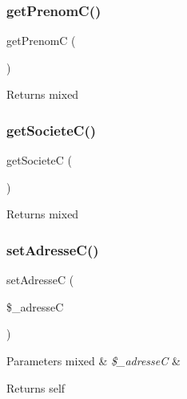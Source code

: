 \subsubsection{\texorpdfstring{get\+Prenom\+C()}{getPrenomC()}}
{\footnotesize\ttfamily get\+PrenomC (\begin{DoxyParamCaption}{ }\end{DoxyParamCaption})}

\begin{DoxyReturn}{Returns}
mixed 
\end{DoxyReturn}
\mbox{\label{class_contact_a77bd836d4246ea19b2df1f7ac1923a5c}} 
\subsubsection{\texorpdfstring{get\+Societe\+C()}{getSocieteC()}}
{\footnotesize\ttfamily get\+SocieteC (\begin{DoxyParamCaption}{ }\end{DoxyParamCaption})}

\begin{DoxyReturn}{Returns}
mixed 
\end{DoxyReturn}
\mbox{\label{class_contact_a78ff82d992475151b042fc0c59d7852b}} 
\subsubsection{\texorpdfstring{set\+Adresse\+C()}{setAdresseC()}}
{\footnotesize\ttfamily set\+AdresseC (\begin{DoxyParamCaption}\item[{}]{\$\+\_\+adresseC }\end{DoxyParamCaption})}


\begin{DoxyParams}[1]{Parameters}
mixed & {\em \$\+\_\+adresseC} & \\
\hline
\end{DoxyParams}
\begin{DoxyReturn}{Returns}
self 
\end{DoxyReturn}
\mbox{\label{class_contact_a78aa13315368f029cf258171d05949da}} 
